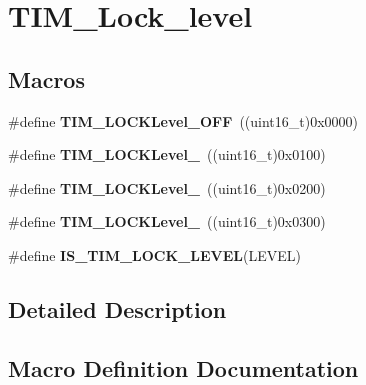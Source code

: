 \hypertarget{group___t_i_m___lock__level}{}\section{T\+I\+M\+\_\+\+Lock\+\_\+level}
\label{group___t_i_m___lock__level}
\subsection*{Macros}
\begin{DoxyCompactItemize}
\item 
\#define {\bfseries T\+I\+M\+\_\+\+L\+O\+C\+K\+Level\+\_\+\+O\+FF}~((uint16\+\_\+t)0x0000)\hypertarget{group___t_i_m___lock__level_ga84d318c62d3e5dfe7082610d03e11f2f}{}\label{group___t_i_m___lock__level_ga84d318c62d3e5dfe7082610d03e11f2f}

\item 
\#define {\bfseries T\+I\+M\+\_\+\+L\+O\+C\+K\+Level\+\_}~((uint16\+\_\+t)0x0100)\hypertarget{group___t_i_m___lock__level_ga7e4326fc7756ebf5e9eb9776c2734aea}{}\label{group___t_i_m___lock__level_ga7e4326fc7756ebf5e9eb9776c2734aea}

\item 
\#define {\bfseries T\+I\+M\+\_\+\+L\+O\+C\+K\+Level\+\_}~((uint16\+\_\+t)0x0200)\hypertarget{group___t_i_m___lock__level_ga91bdf218f766e6a10b7a7df407250d25}{}\label{group___t_i_m___lock__level_ga91bdf218f766e6a10b7a7df407250d25}

\item 
\#define {\bfseries T\+I\+M\+\_\+\+L\+O\+C\+K\+Level\+\_}~((uint16\+\_\+t)0x0300)\hypertarget{group___t_i_m___lock__level_gaa0a0c1ffd9dc582d6571780c1747920b}{}\label{group___t_i_m___lock__level_gaa0a0c1ffd9dc582d6571780c1747920b}

\item 
\#define {\bfseries I\+S\+\_\+\+T\+I\+M\+\_\+\+L\+O\+C\+K\+\_\+\+L\+E\+V\+EL}(L\+E\+V\+EL)
\end{DoxyCompactItemize}


\subsection{Detailed Description}


\subsection{Macro Definition Documentation}
